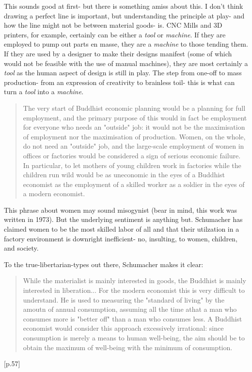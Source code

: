 \documentclass[letterpaper]{article}
\begin{document}
This sounds good at first- but there is something amiss about this. I don't think drawing a perfect line is important, but understanding the principle at play- and how the line might not be between material goods- is. CNC Mills and 3D printers, for example, certainly can be either a \textit{tool} or \textit{machine}. If they are employed to pump out parts en masse, they are a \textit{machine} to those tending them. If they are used by a designer to make their designs manifest (some of which would not be feasible with the use of manual machines), they are most certainly a \textit{tool} as the human aspect of design is still in play. The step from one-off to mass production- from an expression of creativity to brainless toil- this is what can turn a \textit{tool} into a \textit{machine}.


\begin{quote}
The very start of Buddhist economic planning would be a planning for full employment, and the primary purpose of this would in fact be employment for everyone who needs an "outside" job: it would not be the maximisation of employment nor the maximisation of production. Women, on the whole, do not need an "outside" job, and the large-scale employment of women in offices or factories would be considered a sign of serious economic failure. In particular, to let mothers of young children work in factories while the children run wild would be as uneconomic in the eyes of a Buddhist economist as the employment of a skilled worker as a soldier in the eyes of a modern economist.
\end{quote}

This phrase about women may sound misogynist (bear in mind, this work was written in 1973). But the underlying sentiment is anything but. Schumacher has claimed women to be the most skilled labor of all and that their utilzation in a factory environment is downright inefficient- no, insulting, to women, children, and society.

To the true-libertarian-types out there, Schumacher makes it clear:

\begin{quote}
While the materialist is mainly interested in goods, the Buddhist is mainly interested in liberation... For the modern economist this is very difficult to understand. He is used to measuring the "standard of living" by the amoutn of annual consumption, assuming all the time athat a man who consumes more is "better off" than a man who consumes less. A Buddhist economist would consider this approach excessively irrational: since consumption is merely a means to human well-being, the aim should be to obtain the maximum of well-being with the minimum of consumption.
\end{quote} [p.57]
\end{document}
